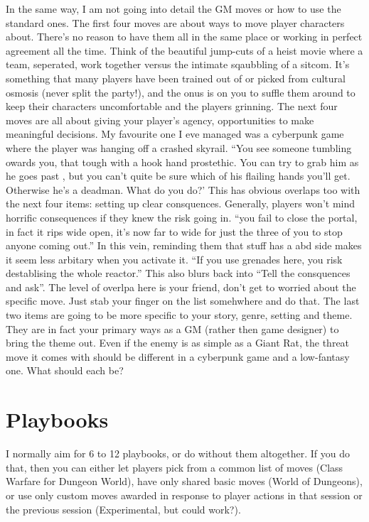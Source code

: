 \documentclass{tufte-handout}
\begin{document}
In the same way, I am not going into detail the GM moves or how to use the standard ones. The first four moves are about ways to move player characters about. There's no reason to have them all in the same place or working in perfect agreement all the time. Think of the beautiful jump-cuts of a heist movie where a team, seperated, work together versus the intimate sqaubbling of a sitcom. It's something that many players have been trained out of or picked from cultural osmosis (never split the party!), and the onus is on you to suffle them around to keep their characters uncomfortable and the players grinning.
The next four moves are all about giving your player's agency, opportunities to make meaningful decisions. My favourite one I eve managed was a cyberpunk game where the player was hanging off a crashed skyrail. ``You see someone tumbling owards you, that tough with a hook hand prostethic. You can try to grab him as he goes past , but you can't quite be sure which of his flailing hands you'll get. Otherwise he's a deadman. What do you do?'
This has obvious overlaps too with the next four items: setting up clear consquences. Generally, players won't mind horrific consequences if they knew the risk going in. ``you fail to close the portal, in fact it rips wide open, it's now far to wide for just the three of you to stop anyone coming out.'' In this vein, reminding them that stuff has a abd side makes it seem less arbitary when you activate it. ``If you use grenades here, you risk destablising the whole reactor.'' This also blurs back into ``Tell the consquences and ask''.  The level of overlpa here is your friend, don't get to worried about the specific move. Just stab your finger on the list somehwhere and do that.
The last two items are going to be more specific to your story, genre, setting and theme. They are in fact your primary ways as a GM (rather then game designer) to bring the theme out.  Even if the enemy is as simple as a Giant Rat, the threat move it comes with should be different in a cyberpunk game and a low-fantasy one. What should each be?

\section{Playbooks}
I normally aim for 6 to 12 playbooks, or do without them altogether. If you do that, then you can either let  players pick from a common list of moves (Class Warfare for Dungeon World), have only shared basic moves (World of Dungeons), or use only custom moves awarded in response to player actions in that session or the previous session (Experimental, but could work?).
\end{document}
